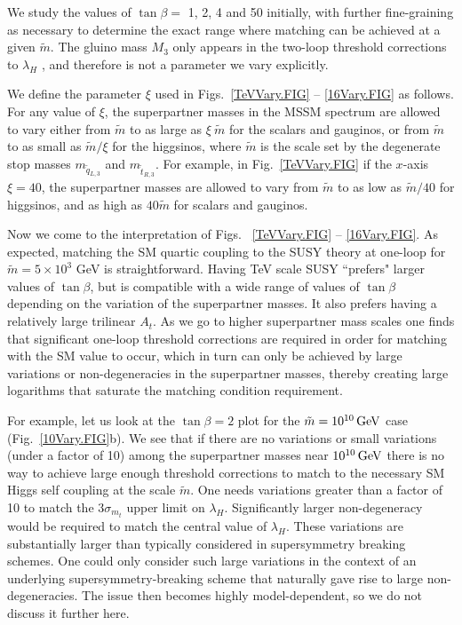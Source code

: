 \documentclass[12pt]{article}
\newcommand{\mS}{\tilde{m}}
\newcommand{\gev}{{\, {\rm GeV}}}
\begin{document}
We study the values of $\tan\beta=$ 1, 2, 4 and 50 initially, with further fine-graining as necessary to determine the exact range where matching can be achieved at a given $\mS$. The gluino mass $M_3$ only appears in the two-loop threshold corrections to $\lambda_H$ \cite{Bagnaschi:2014rsa}, and therefore is not a parameter we vary explicitly. 

We define the parameter $\xi$ used in Figs.~\ref{TeVVary.FIG} -- \ref{16Vary.FIG} as follows. For any value of $\xi$, the superpartner masses in the MSSM spectrum are allowed to vary either from $\mS$ to as large as $\xi \ \mS$ for the scalars and gauginos, or from $\mS$ to as small as $\mS / \xi$ for the higgsinos, where $\mS$ is the scale set by the degenerate stop masses $m_{\tilde q_{L,3}}$ and $m_{\tilde t_{R,3}}$. For example, in Fig.~\ref{TeVVary.FIG} if the $x$-axis $\xi=40$, the superpartner masses are allowed to vary from $\mS$ to as low as $\mS/40$ for higgsinos, and as high as $40\mS$ for scalars and gauginos. 


Now we come to the interpretation of Figs. ~\ref{TeVVary.FIG} -- \ref{16Vary.FIG}. As expected, matching the SM quartic coupling to the SUSY theory at one-loop for $\mS=5\times10^3$ GeV is straightforward. Having TeV scale SUSY ``prefers" larger values of $\tan\beta$, but is compatible with a wide range of values of $\tan\beta$ depending on the variation of the superpartner masses. It also prefers having a relatively large trilinear $A_t$. As we go to higher superpartner mass scales one finds that significant one-loop threshold corrections are required in order for matching with the SM value to occur, which in turn can only be achieved by large variations or non-degeneracies in the superpartner masses, thereby creating large  logarithms that saturate the matching condition requirement. 

For example, let us look at the $\tan\beta=2$ plot for the $\mS=10^{10}\gev$ case (Fig.~\ref{10Vary.FIG}b). We see that if there are no variations or small variations (under a factor of 10) among the superpartner masses near $10^{10}\gev$ there is no way to achieve large enough threshold corrections to match to the necessary SM Higgs self coupling at the scale $\mS$. One needs variations greater than a factor of 10 to match the $3\sigma_{m_t}$ upper limit on $\lambda_H$. Significantly larger non-degeneracy would be required to match the central value of $\lambda_H$. These variations are substantially larger than typically considered in supersymmetry breaking schemes. 
One could only consider such large variations in the context of an underlying supersymmetry-breaking scheme that naturally gave rise to large non-degeneracies. The issue then becomes highly model-dependent, so we do not discuss it further here.
\end{document}
